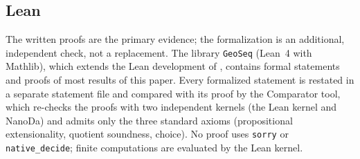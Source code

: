 \subsection{Lean}\label{app:lean}
The written proofs are the primary evidence; the formalization is an additional, independent check, not a replacement. The library \texttt{GeoSeq} (Lean~4 with Mathlib), which extends the Lean development of \cite{Gru26geo}, contains formal statements and proofs of most results of this paper. Every formalized statement is restated in a separate statement file and compared with its proof by the Comparator tool, which re-checks the proofs with two independent kernels (the Lean kernel and NanoDa) and admits only the three standard axioms (propositional extensionality, quotient soundness, choice). No proof uses \texttt{sorry} or \texttt{native\_decide}; finite computations are evaluated by the Lean kernel.

